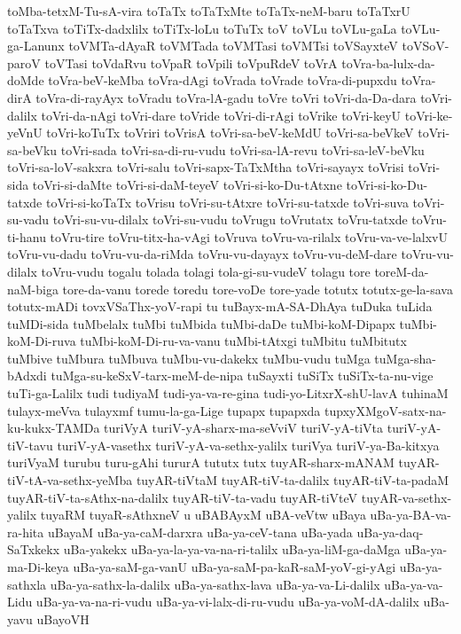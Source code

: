 {toMba-tetxM-Tu-sA-vira
toTaTx
toTaTxMte
toTaTx-neM-baru
toTaTxrU
toTaTxva
toTiTx-dadxlilx
toTiTx-loLu
toTuTx
toV
toVLu
toVLu-gaLa
toVLu-ga-Lanunx
toVMTa-dAyaR
toVMTada
toVMTasi
toVMTsi
toVSayxteV
toVSoV-paroV
toVTasi
toVdaRvu
toVpaR
toVpili
toVpuRdeV
toVrA
toVra-ba-lulx-da-doMde
toVra-beV-keMba
toVra-dAgi
toVrada
toVrade
toVra-di-pupxdu
toVra-dirA
toVra-di-rayAyx
toVradu
toVra-lA-gadu
toVre
toVri
toVri-da-Da-dara
toVri-dalilx
toVri-da-nAgi
toVri-dare
toVride
toVri-di-rAgi
toVrike
toVri-keyU
toVri-ke-yeVnU
toVri-koTuTx
toVriri
toVrisA
toVri-sa-beV-keMdU
toVri-sa-beVkeV
toVri-sa-beVku
toVri-sada
toVri-sa-di-ru-vudu
toVri-sa-lA-revu
toVri-sa-leV-beVku
toVri-sa-loV-sakxra
toVri-salu
toVri-sapx-TaTxMtha
toVri-sayayx
toVrisi
toVri-sida
toVri-si-daMte
toVri-si-daM-teyeV
toVri-si-ko-Du-tAtxne
toVri-si-ko-Du-tatxde
toVri-si-koTaTx
toVrisu
toVri-su-tAtxre
toVri-su-tatxde
toVri-suva
toVri-su-vadu
toVri-su-vu-dilalx
toVri-su-vudu
toVrugu
toVrutatx
toVru-tatxde
toVru-ti-hanu
toVru-tire
toVru-titx-ha-vAgi
toVruva
toVru-va-rilalx
toVru-va-ve-lalxvU
toVru-vu-dadu
toVru-vu-da-riMda
toVru-vu-dayayx
toVru-vu-deM-dare
toVru-vu-dilalx
toVru-vudu
togalu
tolada
tolagi
tola-gi-su-vudeV
tolagu
tore
toreM-da-naM-biga
tore-da-vanu
torede
toredu
tore-voDe
tore-yade
totutx
totutx-ge-la-sava
totutx-mADi
tovxVSaThx-yoV-rapi
tu
tuBayx-mA-SA-DhAya
tuDuka
tuLida
tuMDi-sida
tuMbelalx
tuMbi
tuMbida
tuMbi-daDe
tuMbi-koM-Dipapx
tuMbi-koM-Di-ruva
tuMbi-koM-Di-ru-va-vanu
tuMbi-tAtxgi
tuMbitu
tuMbitutx
tuMbive
tuMbura
tuMbuva
tuMbu-vu-dakekx
tuMbu-vudu
tuMga
tuMga-sha-bAdxdi
tuMga-su-keSxV-tarx-meM-de-nipa
tuSayxti
tuSiTx
tuSiTx-ta-nu-vige
tuTi-ga-Lalilx
tudi
tudiyaM
tudi-ya-va-re-gina
tudi-yo-LitxrX-shU-lavA
tuhinaM
tulayx-meVva
tulayxmf
tumu-la-ga-Lige
tupapx
tupapxda
tupxyXMgoV-satx-na-ku-kukx-TAMDa
turiVyA
turiV-yA-sharx-ma-seVviV
turiV-yA-tiVta
turiV-yA-tiV-tavu
turiV-yA-vasethx
turiV-yA-va-sethx-yalilx
turiVya
turiV-ya-Ba-kitxya
turiVyaM
turubu
turu-gAhi
tururA
tututx
tutx
tuyAR-sharx-mANAM
tuyAR-tiV-tA-va-sethx-yeMba
tuyAR-tiVtaM
tuyAR-tiV-ta-dalilx
tuyAR-tiV-ta-padaM
tuyAR-tiV-ta-sAthx-na-dalilx
tuyAR-tiV-ta-vadu
tuyAR-tiVteV
tuyAR-va-sethx-yalilx
tuyaRM
tuyaR-sAthxneV
u
uBABAyxM
uBA-veVtw
uBaya
uBa-ya-BA-va-ra-hita
uBayaM
uBa-ya-caM-darxra
uBa-ya-ceV-tana
uBa-yada
uBa-ya-daq-SaTxkekx
uBa-yakekx
uBa-ya-la-ya-va-na-ri-talilx
uBa-ya-liM-ga-daMga
uBa-ya-ma-Di-keya
uBa-ya-saM-ga-vanU
uBa-ya-saM-pa-kaR-saM-yoV-gi-yAgi
uBa-ya-sathxla
uBa-ya-sathx-la-dalilx
uBa-ya-sathx-lava
uBa-ya-va-Li-dalilx
uBa-ya-va-Lidu
uBa-ya-va-na-ri-vudu
uBa-ya-vi-lalx-di-ru-vudu
uBa-ya-voM-dA-dalilx
uBa-yavu
uBayoVH
}
